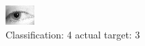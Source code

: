 \begin{figure}[h!]
\begin{center}
\includegraphics[width=0.60\columnwidth]{figures/ID1328_class_4_target_3.png}
\end{center}
\caption{ Classification: 4 actual target: 3}
\label{fig:ID1328_class_4_target_3}
\end{figure}
